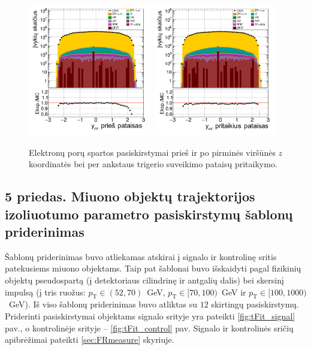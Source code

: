 \documentclass[a4paper, 12pt, oneside]{article}
\newcommand{\pT}{p_{\mathrm{T}}}
\begin{document}
\begin{figure}[H]
	\includegraphics[width=0.48\textwidth]{Magistrinis/ee_rapi_before.png}
	\includegraphics[width=0.48\textwidth]{Magistrinis/ee_rapi_after.png}
	\vspace{-0.5cm}
	\caption{\label{fig:rapiba} Elektronų porų spartos pasiskirstymai prieš ir po pirminės viršūnės $z$ koordinatės bei per ankstaus
	trigerio suveikimo pataisų pritaikymo.}
\end{figure}

\vspace{4cm}
\subsection*{5 priedas. Miuono objektų trajektorijos izoliuotumo parametro pasiskirstymų šablonų priderinimas}
Šablonų priderinimas buvo atliekamas atskirai į signalo ir kontrolinę sritis patekusiems miuono objektams.
Taip pat šablonai buvo išskaidyti pagal fizikinių objektų pseudospartą (į detektoriaus cilindrinę ir antgalių dalis)
bei skersinį impulsą (į tris ruožus: $\pT\!\in\!(52,70)$~GeV, $\pT\!\in\![70,100)$~GeV ir $\pT\!\in\![100,1000)$~GeV).
Iš viso šablonų priderinimas buvo atliktas su $12$ skirtingų pasiskirstymų.
Priderinti pasiskirstymai objektams signalo srityje yra pateikti \ref{fig:tFit_signal} pav., o kontrolinėje srityje --
\ref{fig:tFit_control} pav.
Signalo ir kontrolinės sričių apibrėžimai pateikti \ref{sec:FRmeasure} skyriuje.
\pagebreak
\end{document}
